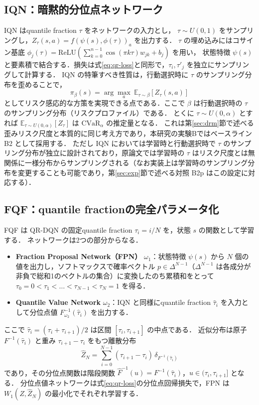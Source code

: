 \documentclass[a4paper,10pt]{jsarticle}
\theoremstyle{definition}
\newcommand{\CVaR}{\mathrm{CVaR}}
\newcommand{\Wone}{W_1}
\newcommand{\Finv}{F^{-1}}
\newcommand{\Fhinv}{\hat{F}^{-1}}
\newcommand{\E}{\mathbb{E}}
\begin{document}
\subsection{IQN：暗黙的分位点ネットワーク}
IQN \cite{dabney2018iqn} はquantile fraction $\tau$ をネットワークの入力とし，
$\tau\sim U(0,1)$ をサンプリングし，$Z_\tau(s,a)=f(\psi(s),\phi(\tau))_a$ を出力する．
$\tau$ の埋め込みにはコサイン基底 $\phi_j(\tau)=\mathrm{ReLU}\!\left(\sum_{k=0}^{n-1}\cos(\pi k\tau)w_{jk}+b_j\right)$ を用い，
状態特徴 $\psi(s)$ と要素積で結合する．損失は式\eqref{eq:qr-loss}と同形で，$\tau_i,\tau'_j$ を独立にサンプリングして計算する．
IQN の特筆すべき性質は，行動選択時に $\tau$ のサンプリング分布を歪めることで，
\begin{equation}
  \pi_\beta(s)=\arg\max_a\ \E_{\tau\sim\beta}\left[Z_\tau(s,a)\right]
\end{equation}
としてリスク感応的な方策を実現できる点である．ここで $\beta$ は行動選択時の $\tau$ のサンプリング分布（リスクプロファイル）である．
とくに $\tau\sim U(0,\alpha)$ とすれば $\E_{\tau\sim U(0,\alpha)}[Z_\tau]$ は $\CVaR_\alpha$ の推定量となる．
これは第\ref{sec:drm}節で述べる歪みリスク尺度と本質的に同じ考え方であり，本研究の実験Bではベースライン B2 として採用する．
ただし IQN においては学習時と行動選択時で $\tau$ のサンプリング分布が独立に設計されており，原論文では学習時の $\tau$ はリスク尺度とは無関係に一様分布からサンプリングされる（なお実装上は学習時のサンプリング分布を変更することも可能であり，第\ref{sec:exp}節で述べる対照 B2p はこの設定に対応する）．

\subsection{FQF：quantile fractionの完全パラメータ化}
\label{subsec:fqf}
FQF \cite{yang2019fqf} は QR-DQN の固定quantile fraction $\tau_i=i/N$ を，状態 $s$ の関数として学習する．
ネットワークは2つの部分からなる．
\begin{itemize}
  \item \textbf{Fraction Proposal Network（FPN）} $\omega_1$：状態特徴 $\psi(s)$ から $N$ 個の値を出力し，ソフトマックスで確率ベクトル $p\in\Delta^{N-1}$（$\Delta^{N-1}$ は各成分が非負で総和1のベクトルの集合）に変換したのち累積和をとって
  $\tau_0=0<\tau_1<\dots<\tau_{N-1}<\tau_N=1$ を得る．
  \item \textbf{Quantile Value Network} $\omega_2$：IQN と同様にquantile fraction $\hat\tau_i$ を入力として分位点値 $\Finv_{\omega_2}(\hat\tau_i)$ を出力する．
\end{itemize}
ここで $\hat\tau_i=(\tau_i+\tau_{i+1})/2$ は区間 $[\tau_i,\tau_{i+1}]$ の中点である．
近似分布は原子 $\Finv(\hat\tau_i)$ と重み $\tau_{i+1}-\tau_i$ をもつ離散分布
\begin{equation}
  \hat Z_N=\sum_{i=0}^{N-1}(\tau_{i+1}-\tau_i)\,\delta_{\Finv(\hat\tau_i)}
  \label{eq:zhat}
\end{equation}
であり，その分位点関数は階段関数 $\Fhinv(u)=\Finv(\hat\tau_i)$，$u\in(\tau_i,\tau_{i+1}]$ となる．
分位点値ネットワークは式\eqref{eq:qr-loss}の分位点回帰損失で，FPN は $\Wone(Z,\hat Z_N)$ の最小化でそれぞれ学習する．
\end{document}
